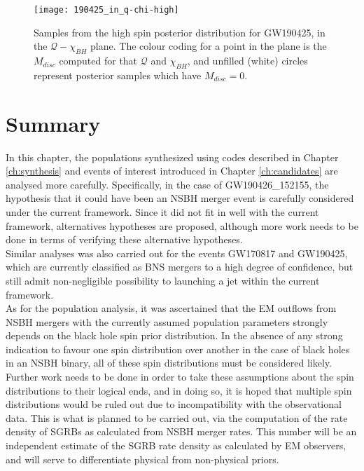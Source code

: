         \begin{figure}[ht]
            \centering
            \texttt{[image: 190425\_in\_q-chi-high]}
            \caption[$M_{disc}$ for GW190425's High Spin Posterior Distribution]
            {
                Samples from the high spin posterior distribution for GW190425, in the
                $\mathcal{Q}-\chi_{BH}$ plane. The colour coding for a point in the plane
                is the $M_{disc}$ computed for that $\mathcal{Q}$ and $\chi_{BH}$, and
                unfilled (white) circles represent posterior samples which have
                $M_{disc} = 0$.
            }
            \label{fig:190425_high}
        \end{figure}

\section{Summary}

    In this chapter, the populations synthesized using codes described in Chapter
    \ref{ch:synthesis} and events of interest introduced in Chapter \ref{ch:candidates}
    are analysed more carefully. Specifically, in the case of GW190426\_152155, the
    hypothesis that it could have been an NSBH merger event is carefully considered
    under the current framework. Since it did not fit in well with the current
    framework, alternatives hypotheses are proposed, although more work needs to be done
    in terms of verifying these alternative hypotheses.\\
    Similar analyses was also carried out for the events GW170817 and GW190425, which
    are currently classified as BNS mergers to a high degree of confidence, but still
    admit non-negligible possibility to launching a jet within the current framework.\\
    As for the population analysis, it was ascertained that the EM outflows from NSBH
    mergers with the currently assumed population parameters strongly depends on the
    black hole spin prior distribution. In the absence of any strong indication to
    favour one spin distribution over another in the case of black holes in an NSBH
    binary, all of these spin distributions must be considered likely. Further work
    needs to be done in order to take these assumptions about the spin distributions to
    their logical ends, and in doing so, it is hoped that multiple spin distributions
    would be ruled out due to incompatibility with the observational data. This is what
    is planned to be carried out, via the computation of the rate density of SGRBs as
    calculated from NSBH merger rates. This number will be an independent estimate of
    the SGRB rate density as calculated by EM observers, and will serve to differentiate
    physical from non-physical priors.

